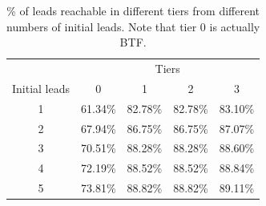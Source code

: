 \documentclass[journal]{IEEEtran}
\begin{document}
 




\begin{table}[t!]
\centering
\begin{tabular}{c | c| c |c| c }

			  & \multicolumn{4}{|c}{Tiers}\\
Initial leads & 0 & 1 & 2 & 3 \\
\hline
1 & 61.34\% & 82.78\% & 82.78\% & 83.10\%\\
2 & 67.94\% & 86.75\% & 86.75\% & 87.07\%\\
3 & 70.51\% & 88.28\% & 88.28\% & 88.60\%\\
4 & 72.19\% & 88.52\% & 88.52\% & 88.84\%\\
5 & 73.81\% & 88.82\% & 88.82\% & 89.11\%\\

\end{tabular}%
\caption{\label{tab:tiers}\label{tab:BTFtiers}\% of leads reachable in different tiers from different numbers of initial leads. Note that tier 0 is actually BTF. %
%
}%
\end{table}

\end{document}
